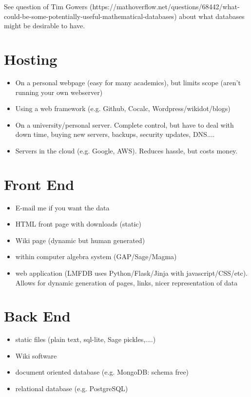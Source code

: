 \documentclass{article}
\begin{document}
See question of Tim Gowers (https://mathoverflow.net/questions/68442/what-could-be-some-potentially-useful-mathematical-databases) about what databases might be desirable to have.

\section{Hosting}

\begin{itemize}
\item On a personal webpage (easy for many academics), but limits scope (aren't running your own webserver)
\item Using a web framework (e.g. Github, Cocalc, Wordpress/wikidot/blogs)
\item On a university/personal server.  Complete control, but have to deal with down time, buying new servers, backups, security updates, DNS....
\item Servers in the cloud (e.g. Google, AWS).  Reduces hassle, but costs money.
\end{itemize}

\section{Front End}

\begin{itemize}
\item E-mail me if you want the data
\item HTML front page with downloads (static)
\item Wiki page (dynamic but human generated)
\item within computer algebra system (GAP/Sage/Magma)
\item web application (LMFDB uses Python/Flask/Jinja with javascript/CSS/etc).  Allows for dynamic generation of pages, links, nicer representation of data
\end{itemize}

\section{Back End}

\begin{itemize}
\item static files (plain text, sql-lite, Sage pickles,....)
\item Wiki software
\item document oriented database (e.g. MongoDB: schema free)
\item relational database (e.g. PostgreSQL)
\end{itemize}
\end{document}
